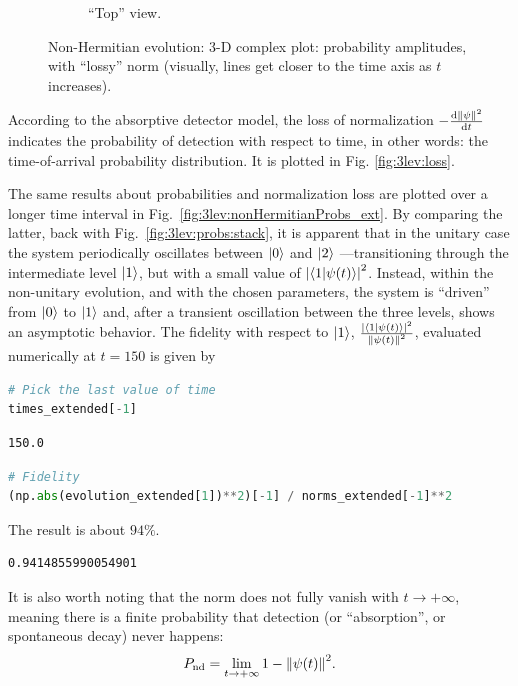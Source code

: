 \begin{figure}[]
\begin{subfigure}[b]{\textwidth}
    \caption{``Top'' view.}
  \end{subfigure}
  \caption[
    Probability amplitudes, with ``lossy'' norm
  ]{
    Non-Hermitian evolution: 3-D complex plot: probability amplitudes, with ``lossy''
    norm (visually, lines get closer to the time axis as $t$ increases).
  }
  \label{fig:3lev:nonHermitianEvol}
\end{figure}

According to the absorptive detector model, the loss of normalization
$-\dv{\norm{\psi}^2}{t}$ indicates the probability of detection
with respect to time, in other words: the time-of-arrival
probability distribution. It is plotted in Fig. \ref{fig:3lev:loss}.

The same results
about probabilities and normalization loss
are plotted
over a longer time interval
in Fig.~\ref{fig:3lev:nonHermitianProbs_ext}.
By comparing the latter,
back with Fig.~\ref{fig:3lev:probs:stack},
it is apparent that in the unitary case the system
periodically oscillates between $\ket{0}$ and $\ket{2}$
---transitioning through the intermediate level $\ket{1}$,
but with a small value of $\abs{\braket{1}{\psi(t)}}^2$.
Instead, within the non-unitary evolution, and with the chosen parameters,
the system is ``driven'' from $\ket{0}$ to $\ket{1}$ and,
after a transient oscillation between the three levels,
shows an asymptotic behavior.
The fidelity with respect to $\ket{1}$,
$\frac{\abs{\braket{1}{\psi(t)}}^2}{\norm{\psi(t)}^2}$,
evaluated numerically at $t=150$ is given by
\begin{lstlisting}[language=Python]
# Pick the last value of time
times_extended[-1]
\end{lstlisting}
\begin{lstlisting}
150.0
\end{lstlisting}
\begin{lstlisting}[language=Python]
# Fidelity
(np.abs(evolution_extended[1])**2)[-1] / norms_extended[-1]**2
\end{lstlisting}
The result is about $94\%$.
\begin{lstlisting}
0.9414855990054901
\end{lstlisting}
It is also worth noting that the norm does not fully vanish with $t \rightarrow +\infty$,
meaning there is a finite probability that detection (or ``absorption'', or spontaneous decay) never happens:
\begin{equation*}
  P_{\mathrm{nd}} = \lim_{t \rightarrow +\infty} 1 - \norm{\psi(t)}^2 \text{.}
\end{equation*}
